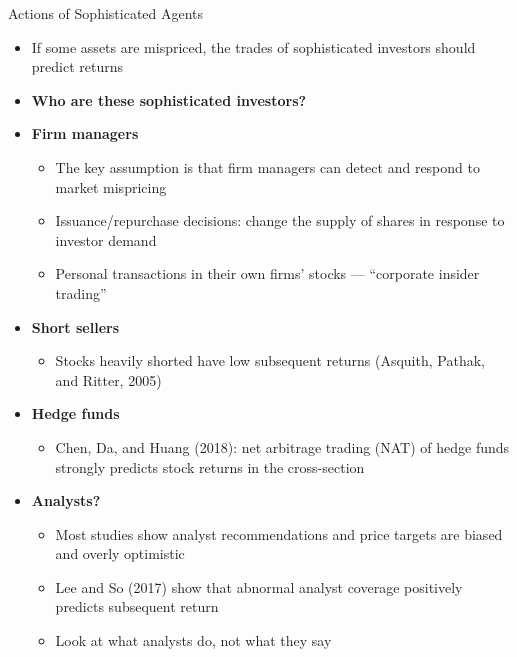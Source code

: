 \documentclass[aspectratio=169, 11pt]{beamer}
\begin{document}
\begin{frame}[shrink=5]{Actions of Sophisticated Agents}
\begin{itemize}
\item If some assets are mispriced, the trades of sophisticated investors should predict returns
\item \textbf{Who are these sophisticated investors?}
\item \textbf{Firm managers}
  \begin{itemize}
  \item The key assumption is that firm managers can detect and respond to market mispricing
  \item Issuance/repurchase decisions: change the supply of shares in response to investor demand
  \item Personal transactions in their own firms' stocks --- ``corporate insider trading''
  \end{itemize}
\item \textbf{Short sellers}
  \begin{itemize}
  \item Stocks heavily shorted have low subsequent returns (Asquith, Pathak, and Ritter, 2005)
  \end{itemize}
\item \textbf{Hedge funds}
  \begin{itemize}
  \item Chen, Da, and Huang (2018): net arbitrage trading (NAT) of hedge funds strongly predicts stock returns in the cross-section
  \end{itemize}
\item \textbf{Analysts?}
  \begin{itemize}
  	\item Most studies show analyst recommendations and price targets are biased and overly optimistic
    \item Lee and So (2017) show that abnormal analyst coverage positively predicts subsequent return
    \item Look at what analysts do, not what they say 
  \end{itemize}
\end{itemize}
\end{frame}
\end{document}
